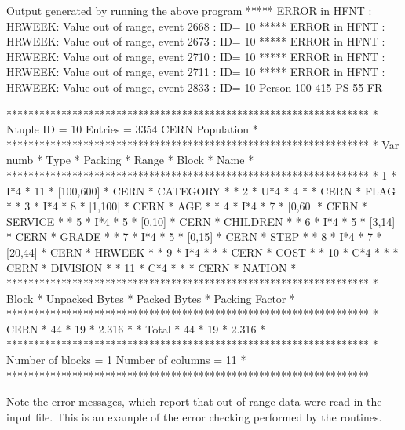\begin{XMPt}{Output generated by running the above program}
 ***** ERROR in HFNT : HRWEEK: Value out of range, event     2668 : ID=      10
 ***** ERROR in HFNT : HRWEEK: Value out of range, event     2673 : ID=      10
 ***** ERROR in HFNT : HRWEEK: Value out of range, event     2710 : ID=      10
 ***** ERROR in HFNT : HRWEEK: Value out of range, event     2711 : ID=      10
 ***** ERROR in HFNT : HRWEEK: Value out of range, event     2833 : ID=      10
 Person 100 415 PS    55 FR

 ******************************************************************
 * Ntuple ID = 10     Entries = 3354      CERN Population         *
 ******************************************************************
 * Var numb * Type * Packing *    Range     *  Block   *  Name    *
 ******************************************************************
 *      1   * I*4  *    11   * [100,600]    * CERN     * CATEGORY *
 *      2   * U*4  *    4    *              * CERN     * FLAG     *
 *      3   * I*4  *    8    * [1,100]      * CERN     * AGE      *
 *      4   * I*4  *    7    * [0,60]       * CERN     * SERVICE  *
 *      5   * I*4  *    5    * [0,10]       * CERN     * CHILDREN *
 *      6   * I*4  *    5    * [3,14]       * CERN     * GRADE    *
 *      7   * I*4  *    5    * [0,15]       * CERN     * STEP     *
 *      8   * I*4  *    7    * [20,44]      * CERN     * HRWEEK   *
 *      9   * I*4  *         *              * CERN     * COST     *
 *     10   * C*4  *         *              * CERN     * DIVISION *
 *     11   * C*4  *         *              * CERN     * NATION   *
 ******************************************************************
 *  Block   * Unpacked Bytes * Packed Bytes *   Packing Factor    *
 ******************************************************************
 * CERN     *    44          *    19        *    2.316            *
 * Total    *    44          *    19        *    2.316            *
 ******************************************************************
 * Number of blocks = 1     Number of columns = 11                *
 ******************************************************************
\label{lis:Ntupletabcreation}
\end{XMPt}

Note the  error messages, which report that out-of-range
data were read in the input file.
This is an example of the error checking performed by
the \CWN{} routines.


